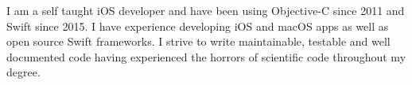 %
I am a self taught iOS developer and have been using Objective-C since 2011 and
Swift since 2015. I have experience developing iOS and macOS apps as well as
open source Swift frameworks. I strive to write maintainable, testable and well
documented code having experienced the horrors of scientific code throughout my
degree.

\bigskip

